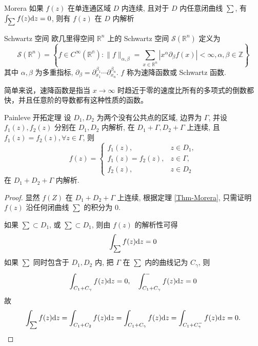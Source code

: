 \begin{theorem}{Morera}\label{Thm-Morera}
  如果 $ f(z) $ 在单连通区域 $ D $ 内连续, 且对于 $ D $ 内任意闭曲线 $ \sum $, 有 $ \int_{\sum} f(z) \mathrm{d} z = 0 $, 则有 $ f(z) $ 在 $ D $ 内解析
\end{theorem}
\begin{definition}{Schwartz 空间}
  欧几里得空间 $ \mathbb{R}^{n} $ 上的 Schwartz 空间 $ \mathcal{S}(\mathbb{R}^{n}) $ 定义为
  \begin{equation}
    \mathcal{S}(\mathbb{R}^{n}) = \left\{ f \in C^{\infty}(\mathbb{R^{n}}) : \| f \|_{\alpha, \beta} = \sum_{x \in \mathbb{R}^{n}} | x^{\alpha} \partial_{\beta}f(x) | < \infty, \alpha, \beta \in \mathbb{Z} \right\}
  \end{equation}
  其中 $ \alpha, \beta $ 为多重指标, $ \partial_{\beta} = \partial_{x_{1}}^{\beta_{1}} \cdots \partial_{x_{n}}^{\beta_{n}} $. $ f $ 称为速降函数或 Schwartz 函数. 
\end{definition}
简单来说，速降函数是指当 $ x \to \infty $ 时趋近于零的速度比所有的多项式的倒数都快，并且任意阶的导数都有这种性质的函数。
\begin{theorem}{Painleve 开拓定理}\label{Thm-Painleve}
  设 $ D_{1}, D_{2} $ 为两个没有公共点的区域, 边界为 $ \Gamma $, 并设 $ f_{1}(z), f_{2}(z) $ 分别在 $ D_{1}, D_{2} $ 内解析, 在 $ D_{1} + \Gamma, D_{2} + \Gamma $ 上连续, 且 $ f_{1}(z) = f_{2}(z), \forall z \in \Gamma $, 则
  \begin{equation}
    f(z) = \begin{cases}
      f_{1}(z), &z \in D_{1} , \\
      f_{1}(z) = f_{2}(z), &z \in \Gamma, \\
      f_{2}(z), &z \in D_{2}
    \end{cases}
  \end{equation}
  在 $ D_{1} + D_{2} + \Gamma $ 内解析.
\end{theorem}
\begin{proof}
  显然 $ f(Z) $ 在 $ D_{1} + D_{2} + \Gamma $ 上连续, 根据定理 \ref{Thm-Morera}, 只需证明 $ f(z) $ 沿任何闭曲线 $ \sum $ 的积分为 $ 0 $.

  如果 $ \sum \subset D_{1} $, 或 $ \sum \subset D_{1} $, 则由 $ f(z) $ 的解析性可得
  \begin{equation}
    \int_{\sum} f(z) \mathrm{d} z = 0
  \end{equation}
  如果 $ \sum $ 同时包含于 $ D_{1}, D_{2} $ 内, 把 $ \Gamma $ 在 $ \sum $ 内的曲线记为 $ C_{\gamma} $, 则
  \begin{equation}
    \int_{C_{1} + C_{\gamma}} f(z) \mathrm{d} z = 0, \quad \int_{C_{1} + C_{\gamma}}^{-} f(z) \mathrm{d} z = 0
  \end{equation}
  故 
  \begin{equation}
    \int_{\sum} f(z) \mathrm{d} z =  \int_{C_{1} + C_{2}} f(z) \mathrm{d} z = \int_{C_{1} + C_{\gamma}} f(z) \mathrm{d} z = \int_{C_{1} + C_{\gamma}^{-}} f(z) \mathrm{d} z = 0.
  \end{equation} 
\end{proof}
